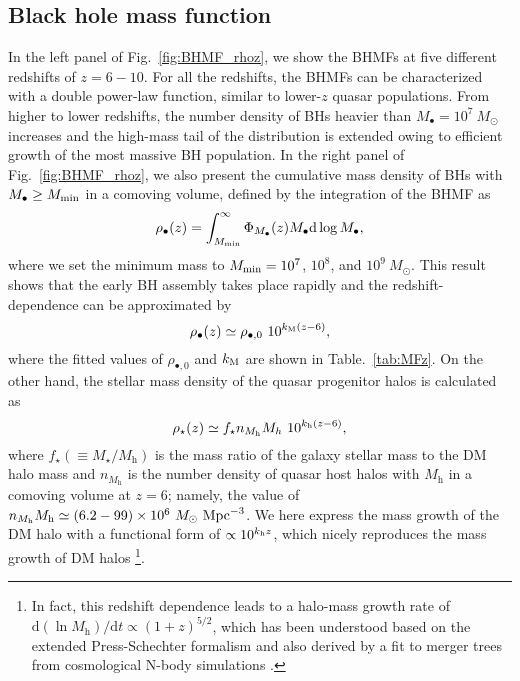 \documentclass[twocolumn, twocolappendix]{aastex63}
\newcommand{\Msun}{M_\odot}
\newcommand{\Mh}{M_\mathrm{h}}
\newcommand{\Mbh}{M_\bullet}
\newcommand{\D}{\mathrm{d}}
\begin{document}
\begin{CJK*}{UTF8}{gbsn}
\subsection{Black hole mass function}

In the left panel of Fig.~\ref{fig:BHMF_rhoz}, we show the BHMFs at five different redshifts of $z=6-10$.
For all the redshifts, the BHMFs can be characterized with a double power-law function, similar to lower-$z$ quasar populations.
From higher to lower redshifts, the number density of BHs heavier than $M_\bullet = 10^7~\Msun$ increases
and the high-mass tail of the distribution is extended owing to efficient growth of the most massive BH population.
In the right panel of Fig.~\ref{fig:BHMF_rhoz}, we also present the cumulative mass density of BHs with $\Mbh \geq M_{\rm min}$ in a comoving volume,
defined by the integration of the BHMF as
%
\begin{equation}
 \rho_\bullet(z)=\int_{M_{\rm min}}^{\infty} \Phi_{\Mbh} (z) \Mbh \D \log \Mbh,
\end{equation}
%
where we set the minimum mass to $M_{\rm min}=10^7$, $10^8$, and $10^9~\Msun$.
This result shows that the early BH assembly takes place rapidly and the redshift-dependence can be approximated by
%
\begin{equation}
\rho_\bullet(z)
\simeq \rho_{\bullet,0}~ 10^{k_{\rm M}(z-6)},
\end{equation}
%
where the fitted values of $\rho_{\bullet,0}$ and $k_{\rm M}$ are shown in Table.~\ref{tab:MFz}.
On the other hand, the stellar mass density of the quasar progenitor halos is calculated as
%
\begin{equation}
\rho_{\star}(z)
\simeq f_\star n_{\Mh} M_h~ 10^{k_{\rm h}(z-6)},
\end{equation}
%
where $f_\star(\equiv M_\star/\Mh)$ is the mass ratio of the galaxy stellar mass to the DM halo mass and
$n_{\Mh}$ is the number density of quasar host halos with $\Mh$ in a comoving volume at $z=6$; namely,
the value of $n_{\Mh}\Mh \simeq (6.2-99)\times 10^6~\Msun~{\rm Mpc}^{-3}$.
We here express the mass growth of the DM halo with a functional form of $\propto 10^{k_{\rm h} z}$,
which nicely reproduces the mass growth of DM halos
\citep[e.g.,][]{2002ApJ...568...52W,2008MNRAS.383..615N,2008MNRAS.388.1792N,2010MNRAS.406.2267F}
\footnote[3]{
In fact, this redshift dependence leads to a halo-mass growth rate of $\D \left(\ln \Mh \right) / \D t \propto(1+z)^{5/2}$,
which has been understood based on the extended Press-Schechter formalism and also derived by
a fit to merger trees from cosmological N-body simulations \citep{2013MNRAS.435..999D}.}.


\end{CJK*}
\end{document}
